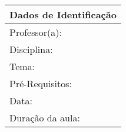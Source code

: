 	\begin{tabular}{ |l|p{11.2cm}| }
	  \hline
	  \multicolumn{2}{|c|}{\textbf{Dados de Identificação}} \\
	  \hline
	  Professor(a):         &    \professores           \\
	  \hline
	  Disciplina:        &    \disciplina          \\
	  \hline
	  Tema:              &    \tema                \\
	  \hline
	  Pré-Requisitos:             &    \prequisito               \\
	  \hline
	  Data:              &    \data                \\
	  \hline
	  Duração da aula:   &    \tempodeaula         \\
	  \hline
	\end{tabular}

\vspace{3mm}